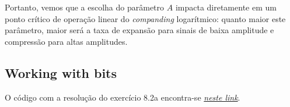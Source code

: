 \documentclass[a4paper]{article}
\begin{document}
Portanto, vemos que a escolha do parâmetro $A$ impacta diretamente em um ponto crítico de operação linear do \textit{companding} logarítmico: quanto maior este parâmetro, maior será a taxa de expansão para sinais de baixa amplitude e compressão para altas amplitudes.

\subsection{Working with bits}

O código com a resolução do exercício 8.2a encontra-se \href{https://github.com/guedes-joaofelipe/CPE793-topics-in-audio-codification/blob/main/exercises/chap02/exercises_chap02.ipynb}{\textit{neste link}}.

%

\end{document}
